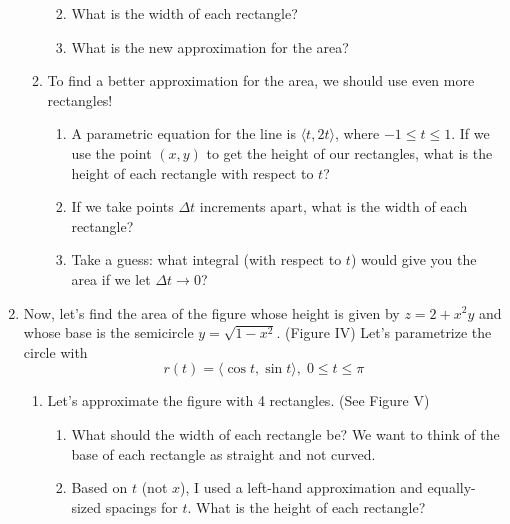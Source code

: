 \documentclass[12pt]{amsart}
\begin{document}
\begin{enumerate}
\begin{enumerate}
\begin{enumerate}
\vspace{0.75in}
\item
What is the width of each rectangle?

\vspace{.5in}
\item
What is the new approximation for the area?

\end{enumerate}

\newpage
\item
To find a better approximation for the area, we should use even more rectangles!  
\begin{enumerate}
\item
A parametric equation for the line is $\langle t, 2t \rangle$, where $-1 \le t\le 1$.  If we use the point $(x,y)$ to get the height of our rectangles, what is the height of each rectangle with respect to $t$?

\vspace{.5in}
\item
If we take points $\Delta t$ increments apart, what is the width of each rectangle?

\vspace{.5in}

\item
Take a guess: what integral (with respect to $t$) would give you the area if we let $\Delta t \rightarrow 0$?
\end{enumerate}
\end{enumerate}


\vspace{0.5in}

\item
Now, let's find the area of the figure whose height is given by $z= 2+x^2y$ and whose base is the semicircle $y=\sqrt{1-x^2}$.  (Figure IV)
Let's parametrize the circle with 
$$r(t) = \langle \cos t, \sin t \rangle, \; 0 \le t \le \pi$$
\begin{enumerate}
\item
 Let's approximate the figure with 4 rectangles.  (See Figure V)  
\begin{enumerate}
\item
What should the width of each rectangle be?  We want to think of the base of each rectangle as straight and not curved.

\vspace{.5in}
\item
Based on $t$ (not $x$), I used a left-hand approximation and equally-sized spacings for $t$.  What is the height of each rectangle?


\end{enumerate}
\end{enumerate}
\end{enumerate}
\end{document}
